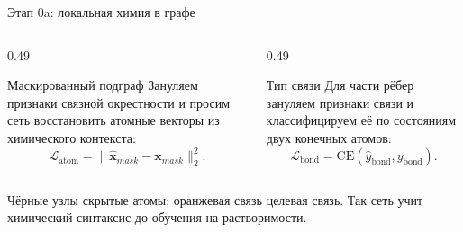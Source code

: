 \documentclass[aspectratio=169,10pt]{beamer}
\newcommand{\smallnote}[1]{{\scriptsize\color{TGSlate}#1}}
\begin{document}
\begin{frame}{Этап 0a: локальная химия в графе}
{}
  \vspace{0.25em}
  \begin{columns}[T,onlytextwidth]
    \begin{column}{0.49\textwidth}
      \begin{block}{Маскированный подграф}
        \scriptsize
        Зануляем признаки связной окрестности и просим сеть восстановить атомные векторы из химического контекста:
        \[
          \mathcal L_{\mathrm{atom}}=\|\hat{\mathbf x}_{mask}-\mathbf x_{mask}\|_2^2.
        \]
      \end{block}
    \end{column}
    \begin{column}{0.49\textwidth}
      \begin{block}{Тип связи}
        \scriptsize
        Для части рёбер зануляем признаки связи и классифицируем её по состояниям двух конечных атомов:
        \[
          \mathcal L_{\mathrm{bond}}=\mathrm{CE}(\hat y_{\mathrm{bond}},y_{\mathrm{bond}}).
        \]
      \end{block}
    \end{column}
  \end{columns}
  \smallnote{Чёрные узлы \textemdash{} скрытые атомы; оранжевая связь \textemdash{} целевая связь. Так сеть учит химический синтаксис до обучения на растворимости.}
\end{frame}
\end{document}
